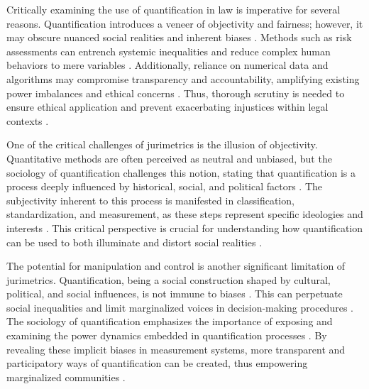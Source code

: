 Critically examining the use of quantification in law is imperative for several reasons. Quantification introduces a veneer of objectivity and fairness; however, it may obscure nuanced social realities and inherent biases \cite{gillborn2017,di2023,calvo2024}. Methods such as risk assessments can entrench systemic inequalities and reduce complex human behaviors to mere variables \cite{lynch2019,sareen2020,demortain2019}. Additionally, reliance on numerical data and algorithms may compromise transparency and accountability, amplifying existing power imbalances and ethical concerns \cite{ant2019,ribeiro2021}. Thus, thorough scrutiny is needed to ensure ethical application and prevent exacerbating injustices within legal contexts \cite{calvo2024,paiva2021}.

One of the critical challenges of jurimetrics is the illusion of objectivity. Quantitative methods are often perceived as neutral and unbiased, but the sociology of quantification challenges this notion, stating that quantification is a process deeply influenced by historical, social, and political factors \cite{10.1007/978-3-319-44000-2_15,10.3390/fi9040068}. The subjectivity inherent to this process is manifested in classification, standardization, and measurement, as these steps represent specific ideologies and interests \cite{10.1590/data.2022.65.3.267,10.1007/978-3-319-44000-2_15}. This critical perspective is crucial for understanding how quantification can be used to both illuminate and distort social realities \cite{10.1590/data.2022.65.3.267,10.3390/fi9040068}.

The potential for manipulation and control is another significant limitation of jurimetrics. Quantification, being a social construction shaped by cultural, political, and social influences, is not immune to biases \cite{10.1590/data.2022.65.3.267,10.3390/fi9040068}. This can perpetuate social inequalities and limit marginalized voices in decision-making procedures \cite{10.1590/data.2022.65.3.267,10.3390/fi9040068}. The sociology of quantification emphasizes the importance of exposing and examining the power dynamics embedded in quantification processes \cite{10.1057/s41599-020-00557-0,10.1080/07329113.2015.1046739}. By revealing these implicit biases in measurement systems, more transparent and participatory ways of quantification can be created, thus empowering marginalized communities \cite{10.1057/s41599-020-00557-0,10.1080/07329113.2015.1046739}.

